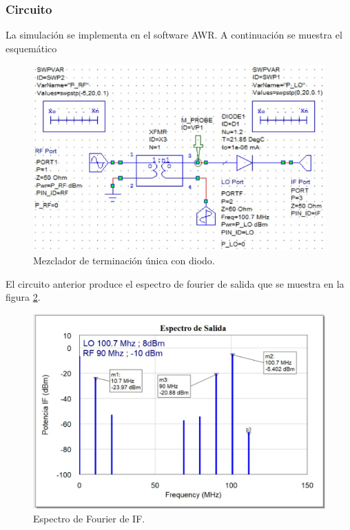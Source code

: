 \documentclass[twocolumn]{article}
\begin{document}
\subsubsection{Circuito}
La simulación se implementa en el software AWR. A continuación se muestra el esquemático
\begin{figure}[h]
  \centering    
	\includegraphics[scale=0.6]{imagenes/circuito1.jpg}
	\caption{Mezclador de terminación única con diodo.}\label{fig:circuito1}
\end{figure}

El circuito anterior produce el espectro de fourier de salida que se muestra en la figura \textcolor{blue}{\ref{fig:IF1}}.
\begin{figure}[h]
  \centering    
	\includegraphics[scale=0.28]{imagenes/IF1.jpg}
	\caption{Espectro de Fourier de IF.}\label{fig:IF1}
\end{figure}
%
\end{document}
